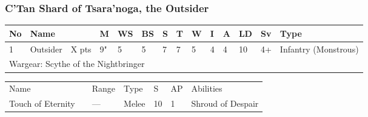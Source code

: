 \newpage
\subsubsection{C'Tan Shard of Tsara'noga, the Outsider}

\noindent
\begin{tabular}{||m{10pt} m{95pt} m{30pt} m{11pt} m{11pt} m{11pt} m{11pt} m{11pt} m{11pt} m{11pt} m{11pt} m{11pt} m{11pt} m{125pt}||}
	\hline
	No & Name & & M & WS & BS & S & T & W & I & A & LD & Sv & Type \\
	\hline
	1 & Outsider & X pts & 9" & 5 & 5 & 7 & 7 & 5 & 4 & 4 & 10 & 4+ & Infantry (Monstrous)\\
	\hline
	\hline
	\multicolumn{14}{||Z{532 pt}||}{Wargear: Scythe of the Nightbringer}\\
	\hline
\end{tabular}

\noindent
\begin{tabular}{||m{140pt} m{0pt} m{31pt} m{55pt} m{12pt} m{12pt} m{210pt}||}
	\hline
	Name & & Range & Type & S & AP & Abilities \\
	Touch of Eternity & & — & Melee & 10 & 1 & Shroud of Despair \\
	\hline	
	\hline
\end{tabular}

